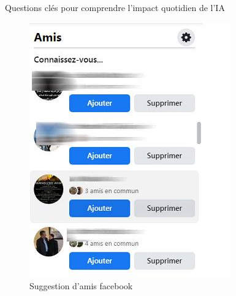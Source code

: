 \documentclass{beamer}
\begin{document}
\begin{frame}{Questions clés pour comprendre l'impact quotidien de l'IA}
\begin{figure}
\begin{minipage}{0.44\textwidth}
	\includegraphics[width=\linewidth]{connaissez-vous-facebook.jpg}
	\caption{Suggestion d'amis facebook}
\end{minipage}
\end{figure}
\end{frame}
\end{document}
